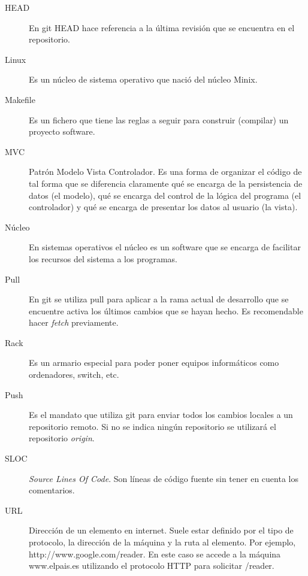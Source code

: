 \begin{description}
	\item[HEAD] En git HEAD hace referencia a la última revisión que se encuentra en el repositorio.

	\item[Linux] Es un núcleo de sistema operativo que nació del núcleo Minix.
	
	\item[Makefile] Es un fichero que tiene las reglas a seguir para construir (compilar) un proyecto software.
	
	\item[MVC] Patrón Modelo Vista Controlador. Es una forma de organizar el código de tal forma que se diferencia claramente qué se encarga de la persistencia de datos (el modelo), qué se encarga del control de la lógica del programa (el controlador) y qué se encarga de presentar los datos al usuario (la vista).
	
	\item[Núcleo] En sistemas operativos el núcleo es un software que se encarga de facilitar los recursos del sistema a los programas.
	
	\item[Pull] En git se utiliza pull para aplicar a la rama actual de desarrollo que se encuentre activa los últimos cambios que se hayan hecho. Es recomendable hacer \emph{fetch} previamente.
	
	\item[Rack] Es un armario especial para poder poner equipos informáticos como ordenadores, switch, etc.
	
	\item[Push] Es el mandato que utiliza git para enviar todos los cambios locales a un repositorio remoto. Si no se indica ningún repositorio se utilizará el repositorio \emph{origin}.
	
	\item[SLOC] \emph{Source Lines Of Code}. Son líneas de código fuente sin tener en cuenta los comentarios.
	
	\item[URL] Dirección de un elemento en internet. Suele estar definido por el tipo de protocolo, la dirección de la máquina y la ruta al elemento. Por ejemplo, http://www.google.com/reader. En este caso se accede a la máquina www.elpais.es utilizando el protocolo HTTP para solicitar /reader.
\end{description}
